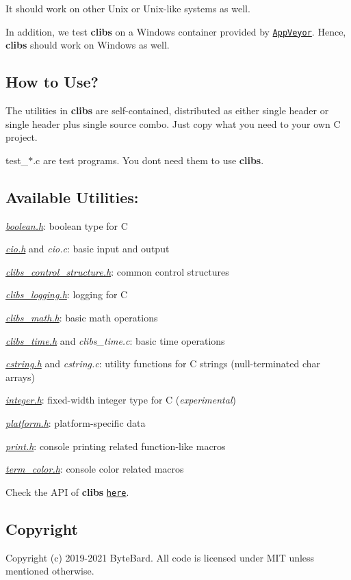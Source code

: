 It should work on other Unix or Unix-\/like systems as well.

In addition, we test {\bfseries clibs} on a Windows container provided by \href{https://www.appveyor.com/}{\tt App\+Veyor}. Hence, {\bfseries clibs} should work on Windows as well.

\subsection*{How to Use?}

The utilities in {\bfseries clibs} are self-\/contained, distributed as either single header or single header plus single source combo. Just copy what you need to your own C project.

test\+\_\+$\ast$.c are test programs. You don\textquotesingle{}t need them to use {\bfseries clibs}.

\subsection*{Available Utilities\+:}


\begin{DoxyItemize}
\item {\itshape \hyperlink{boolean_8h}{boolean.\+h}}\+: boolean type for C
\item {\itshape \hyperlink{cio_8h}{cio.\+h}} and {\itshape cio.\+c}\+: basic input and output
\item {\itshape \hyperlink{clibs__control__structure_8h}{clibs\+\_\+control\+\_\+structure.\+h}}\+: common control structures
\item {\itshape \hyperlink{clibs__logging_8h}{clibs\+\_\+logging.\+h}}\+: logging for C
\item {\itshape \hyperlink{clibs__math_8h}{clibs\+\_\+math.\+h}}\+: basic math operations
\item {\itshape \hyperlink{clibs__time_8h}{clibs\+\_\+time.\+h}} and {\itshape clibs\+\_\+time.\+c}\+: basic time operations
\item {\itshape \hyperlink{cstring_8h}{cstring.\+h}} and {\itshape cstring.\+c}\+: utility functions for C strings (null-\/terminated {\ttfamily char} arrays)
\item {\itshape \hyperlink{integer_8h}{integer.\+h}}\+: fixed-\/width integer type for C ({\itshape experimental})
\item {\itshape \hyperlink{platform_8h}{platform.\+h}}\+: platform-\/specific data
\item {\itshape \hyperlink{print_8h}{print.\+h}}\+: console printing related function-\/like macros
\item {\itshape \hyperlink{term__color_8h}{term\+\_\+color.\+h}}\+: console color related macros
\end{DoxyItemize}

Check the A\+PI of {\bfseries clibs} \href{https://cwchentw.github.io/clibs/html/index.html}{\tt here}.

\subsection*{Copyright}

Copyright (c) 2019-\/2021 ByteBard. All code is licensed under M\+IT unless mentioned otherwise. 